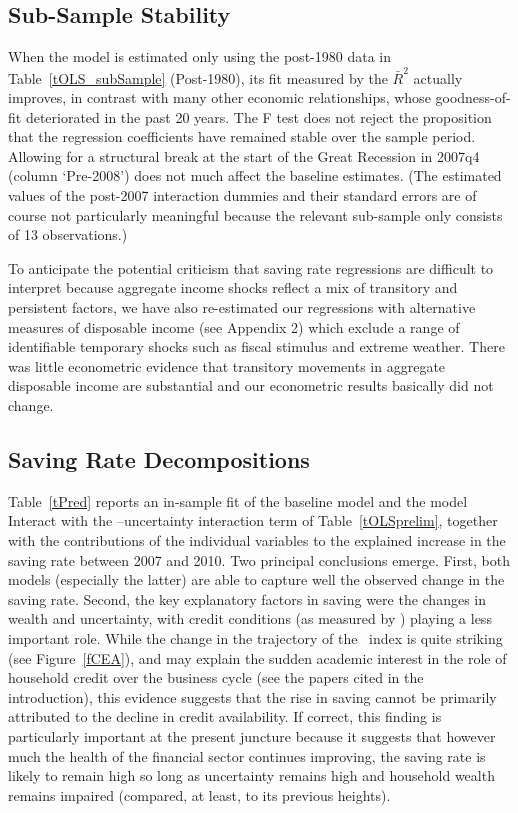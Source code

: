 \documentclass[titlepage]{\econtex}
\begin{document}
\subsection{Sub-Sample Stability}

When the model is estimated only using the post-1980 data in Table~\ref{tOLS_subSample} (Post-1980), its fit measured by the $\bar{R}^2$ actually improves, in contrast with many other economic relationships, 
whose goodness-of-fit deteriorated in the past 20 years.  The F test does not reject the proposition that the regression coefficients have remained stable over the sample period. Allowing for a structural break at the start of the Great Recession in 2007q4 (column `Pre-2008') does not much affect the baseline estimates. (The estimated values of the post-2007 interaction dummies and their standard errors are of course not particularly meaningful because the relevant sub-sample only consists of 13 observations.)

To anticipate the potential criticism that saving rate regressions are difficult to interpret because aggregate income shocks reflect a mix of transitory and persistent factors, we have also re-estimated our regressions with alternative measures of disposable income (see Appendix 2) which exclude a range of identifiable temporary shocks such as fiscal stimulus and extreme weather. There was little econometric evidence that transitory movements in aggregate disposable income are substantial and our econometric results basically did not change.

\subsection{Saving Rate Decompositions}

Table~\ref{tPred} reports an in-sample fit of the baseline model and
the model Interact with the \CEA--uncertainty interaction term of
Table~\ref{tOLSprelim}, together with the contributions of the individual
variables to the explained increase in the saving rate between 2007
and 2010. Two principal conclusions emerge. First, both models
(especially the latter) are able to capture well the observed change
in the saving rate. Second, the key explanatory factors in saving were the changes in wealth and uncertainty, with
credit conditions (as measured by \CEA) playing a less important role.  While the
change in the trajectory of the \CEA\ index is quite striking (see
Figure~\ref{fCEA}), and may explain the sudden academic interest in the
role of household credit over the business cycle (see the papers cited
in the introduction), this evidence suggests that the rise in saving
cannot be primarily attributed to the decline in credit availability.  If
correct, this finding is particularly important at the present
juncture because it suggests that however much the health of the
financial sector continues improving, the saving rate is likely to remain high so
long as uncertainty remains high and household wealth remains impaired
(compared, at least, to its previous heights).
\end{document}
